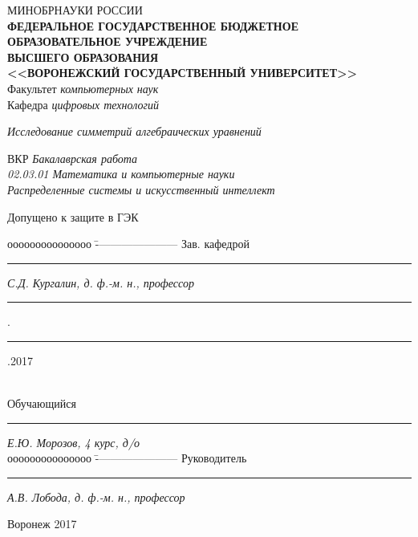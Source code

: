 \documentclass[../main.tex]{subfiles}
\begin{document}
\begin{spacing}{1.2}
{\sffamily \begin{small}
\thispagestyle{empty}
\center 
{МИНОБРНАУКИ РОССИИ}\\ \!
{\footnotesize\textbf{ФЕДЕРАЛЬНОЕ ГОСУДАРСТВЕННОЕ БЮДЖЕТНОЕ ОБРАЗОВАТЕЛЬНОЕ УЧРЕЖДЕНИЕ}\\ \!\!\textbf{ВЫСШЕГО ОБРАЗОВАНИЯ}}\\ \!\!\!\!
\textbf{<<ВОРОНЕЖСКИЙ ГОСУДАРСТВЕННЫЙ УНИВЕРСИТЕТ>>}\\
\vspace{0.25cm}
{Факультет \textit{компьютерных наук}}\\
\vspace{0.25cm}
{Кафедра \textit{цифровых технологий}}\\

\vspace{1cm}

\textit{Исследование симметрий алгебраических уравнений}\\

\vspace{1cm}

{ВКР} \textit{Бакалаврская работа}\\
\textit{02.03.01 Математика и компьютерные науки}\\
\textit{Распределенные системы и искусственный интеллект}\\

\vspace{4.0cm}
\begin{flushleft}
{Допущено к защите в ГЭК}
\end{flushleft}
\begin{tabbing}
ооооооооооооооо	\=	----------------------	\kill
Зав. кафедрой\> 	\rule[0mm]{3cm}{0,3mm}	\textit{С.Д. Кургалин, д. ф.-м. н., профессор}{ \rule[0mm]{5mm}{0,3mm}.\rule[0mm]{5mm}{0,3mm}.2017}  \\
Обучающийся \> 	\rule[0mm]{3cm}{0,3mm}	\textit{Е.Ю. Морозов, 4 курс, д/о} \\ 
ооооооооооооооо	\=	----------------------	\kill
Руководитель\> 	\rule[0mm]{3cm}{0,3mm}  \textit{А.В. Лобода, д. ф.-м. н., профессор}
\end{tabbing}

\vspace{2cm}

\centerline{Воронеж 2017}
\end{small}}
\end{spacing}
\clearpage
\end{document}
